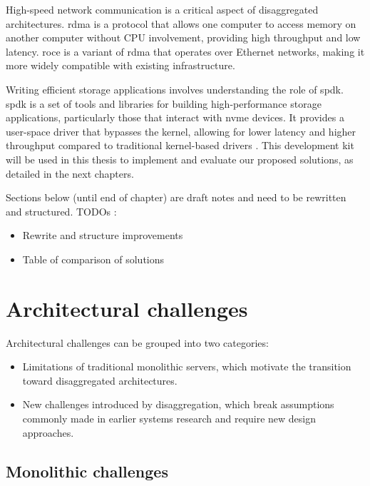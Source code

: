 High-speed network communication is a critical aspect of disaggregated architectures. \acrfull{rdma} \cite{rdma_rfc} \cite{rdma_consortium} is a protocol that allows one computer to access memory on another computer without CPU involvement, providing high throughput and low latency. \acrfull{roce} \cite{roce_nvidia_docs} is a variant of \acrshort{rdma} that operates over Ethernet networks, making it more widely compatible with existing infrastructure.


Writing efficient storage applications involves understanding the role of \acrfull{spdk}. \acrshort{spdk} is a set of tools and libraries for building high-performance storage applications, particularly those that interact with \acrshort{nvme} devices. It provides a user-space driver that bypasses the kernel, allowing for lower latency and higher throughput compared to traditional kernel-based drivers \cite{noauthor_storage_nodate}. This development kit will be used in this thesis to implement and evaluate our proposed solutions, as detailed in the next chapters.


\begin{draftbox}
	Sections below (until end of chapter) are draft notes and need to be rewritten and structured.
	TODOs : 
	\begin{itemize}
		\item Rewrite and structure improvements
		\item Table of comparison of solutions
	\end{itemize}
\end{draftbox}


\section{Architectural challenges}

Architectural challenges can be grouped into two categories:

\begin{itemize}
	\item Limitations of traditional monolithic servers, which motivate the transition toward disaggregated architectures.
	\item New challenges introduced by disaggregation, which break assumptions commonly made in earlier systems research and require new design approaches.
\end{itemize}

\subsection{Monolithic challenges}

